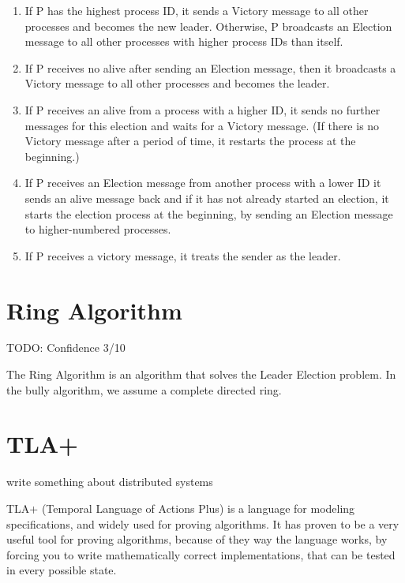 \documentclass{report}
\begin{document}
\begin{enumerate}
\item If P has the highest process ID, it sends a Victory message to all other processes and becomes the new leader. Otherwise, P broadcasts an Election message to all other processes with higher process IDs than itself.
\item If P receives no alive after sending an Election message, then it broadcasts a Victory message to all other processes and becomes the leader.
\item If P receives an alive from a process with a higher ID, it sends no further messages for this election and waits for a Victory message. (If there is no Victory message after a period of time, it restarts the process at the beginning.)
\item If P receives an Election message from another process with a lower ID it sends an alive message back and if it has not already started an election, it starts the election process at the beginning, by sending an Election message to higher-numbered processes.
\item If P receives a victory message, it treats the sender as the leader.
\end{enumerate}




\section{Ring Algorithm}
\begin{callout}
TODO: Confidence 3/10
\end{callout}

The Ring Algorithm is an algorithm that solves the Leader Election problem. In the bully algorithm, we assume a complete directed ring.


\section{TLA+}
\begin{callout}
  write something about distributed systems
\end{callout}

TLA+ (Temporal Language of Actions Plus) is a language for modeling specifications, and widely used for proving algorithms. It has proven to be a very useful tool for proving algorithms, because of they way the language works, by forcing you to write mathematically correct implementations, that can be tested in every possible state.
\end{document}
